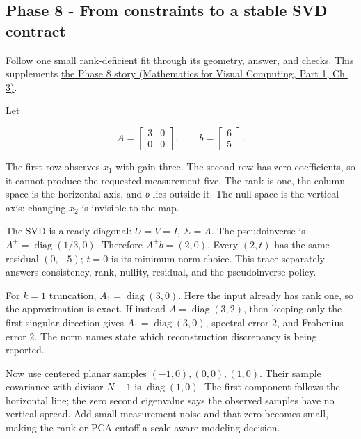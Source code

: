 \subsection{Phase 8 - From constraints to a stable SVD contract}\label{appendix-92ff77d4dfdc-phase-8---from-constraints-to-a-stable-svd-contract}

\hypertarget{appendix-92ff77d4dfdc-phase-8---from-constraints-to-a-stable-svd-contract}{}

Follow one small rank-deficient fit through its geometry, answer, and checks. This supplements \href{../02-Mathematics-for-Visual-Computing-P01/main.pdf\#01-foundations-i-ch019-the-graphics-problem-hiding-inside-a-matrix-equation}{the Phase 8 story (Mathematics for Visual Computing, Part 1, Ch. 3)}.

Let

\[
A=\begin{bmatrix}3&0\\0&0\end{bmatrix},\qquad
b=\begin{bmatrix}6\\5\end{bmatrix}.
\]

The first row observes \(x_1\) with gain three. The second row has zero coefficients, so it cannot produce the requested measurement five. The rank is one, the column space is the horizontal axis, and \(b\) lies outside it. The null space is the vertical axis: changing \(x_2\) is invisible to the map.

The SVD is already diagonal: \(U=V=I\), \(\Sigma=A\). The pseudoinverse is \(A^+=\operatorname{diag}(1/3,0)\). Therefore \(A^+b=(2,0)\). Every \((2,t)\) has the same residual \((0,-5)\); \(t=0\) is its minimum-norm choice. This trace separately answers consistency, rank, nullity, residual, and the pseudoinverse policy.

For \(k=1\) truncation, \(A_1=\operatorname{diag}(3,0)\). Here the input already has rank one, so the approximation is exact. If instead \(A=\operatorname{diag}(3,2)\), then keeping only the first singular direction gives \(A_1=\operatorname{diag}(3,0)\), spectral error \(2\), and Frobenius error \(2\). The norm names state which reconstruction discrepancy is being reported.

Now use centered planar samples \((-1,0),(0,0),(1,0)\). Their sample covariance with divisor \(N-1\) is \(\operatorname{diag}(1,0)\). The first component follows the horizontal line; the zero second eigenvalue says the observed samples have no vertical spread. Add small measurement noise and that zero becomes small, making the rank or PCA cutoff a scale-aware modeling decision.

